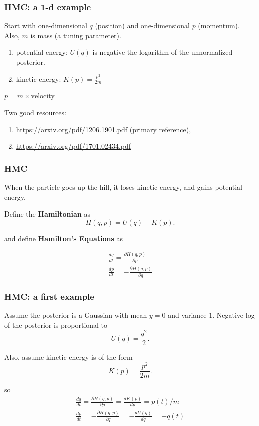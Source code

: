 \documentclass{beamer}
\begin{document}
\begin{frame}
\frametitle{HMC: a 1-d example}

Start with one-dimensional $q$ (position) and one-dimensional $p$ (momentum). Also, $m$ is mass (a tuning parameter).
\newline

\begin{enumerate}
\item potential energy: $U(q)$ is negative the logarithm of the unnormalized posterior.
\item kinetic energy: $K(p) = \frac{p^2}{2m}$ 
\end{enumerate}
$p =  m \times \text{velocity}$
\newline

Two good resources:
\begin{enumerate}
\item \url{https://arxiv.org/pdf/1206.1901.pdf} (primary reference), 
\item \url{https://arxiv.org/pdf/1701.02434.pdf}
\end{enumerate}

\end{frame}


\begin{frame}
\frametitle{HMC}

When the particle goes up the hill, it loses kinetic energy, and gains potential energy. 
\newline

Define the {\bf Hamiltonian} as
$$
H(q,p) = U(q) + K(p).
$$ 

and define {\bf Hamilton's Equations} as

\begin{gather}
\frac{dq}{dt} = \frac{\partial H(q,p)}{\partial p} \\
\frac{dp}{dt} = -\frac{\partial H(q,p)}{\partial q}
\end{gather}

\end{frame}

\begin{frame}
\frametitle{HMC: a first example}


Assume the posterior is a Gaussian with mean $y=0$ and variance $1$. Negative log of the posterior is proportional to 
$$
U(q) = \frac{q^2}{2}.
$$

Also, assume kinetic energy is of the form
$$
K(p) = \frac{p^2}{2m}.
$$
\pause


so
\begin{gather}
\frac{dq}{dt} = \frac{\partial H(q,p)}{\partial p} =  \frac{d K(p) }{d p} = p(t)/m \\
\frac{dp}{dt} = -\frac{\partial H(q,p)}{\partial q} = -\frac{d U(q)}{d q} = -q(t)
\end{gather}

\end{frame}
\end{document}
